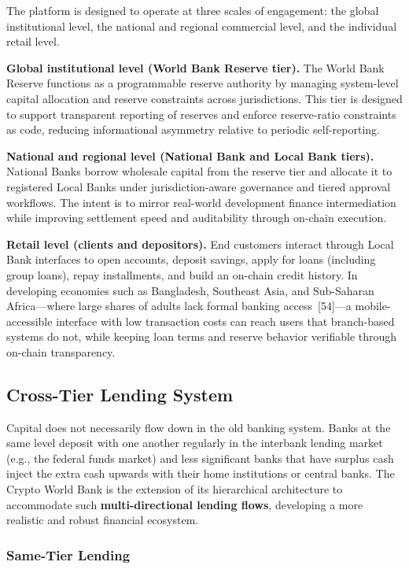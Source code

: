 \documentclass[12pt,a4paper]{report}
\begin{document}
The platform is designed to operate at three scales of engagement: the global institutional level, the national and regional commercial level, and the individual retail level.

\textbf{Global institutional level (World Bank Reserve tier).} The World Bank Reserve functions as a programmable reserve authority by managing system-level capital allocation and reserve constraints across jurisdictions. This tier is designed to support transparent reporting of reserves and enforce reserve-ratio constraints as code, reducing informational asymmetry relative to periodic self-reporting.

\textbf{National and regional level (National Bank and Local Bank tiers).} National Banks borrow wholesale capital from the reserve tier and allocate it to registered Local Banks under jurisdiction-aware governance and tiered approval workflows. The intent is to mirror real-world development finance intermediation while improving settlement speed and auditability through on-chain execution.

\textbf{Retail level (clients and depositors).} End customers interact through Local Bank interfaces to open accounts, deposit savings, apply for loans (including group loans), repay installments, and build an on-chain credit history. In developing economies such as Bangladesh, Southeast Asia, and Sub-Saharan Africa---where large shares of adults lack formal banking access~[54]---a mobile-accessible interface with low transaction costs can reach users that branch-based systems do not, while keeping loan terms and reserve behavior verifiable through on-chain transparency.

\subsection{Cross-Tier Lending System}

Capital does not necessarily flow down in the old banking system. Banks at the same level deposit with one another regularly in the interbank lending market (e.g., the federal funds market) and less significant banks that have surplus cash inject the extra cash upwards with their home institutions or central banks. The Crypto World Bank is the extension of its hierarchical architecture to accommodate such \textbf{multi-directional lending flows}, developing a more realistic and robust financial ecosystem.

\subsubsection{Same-Tier Lending}
\end{document}
